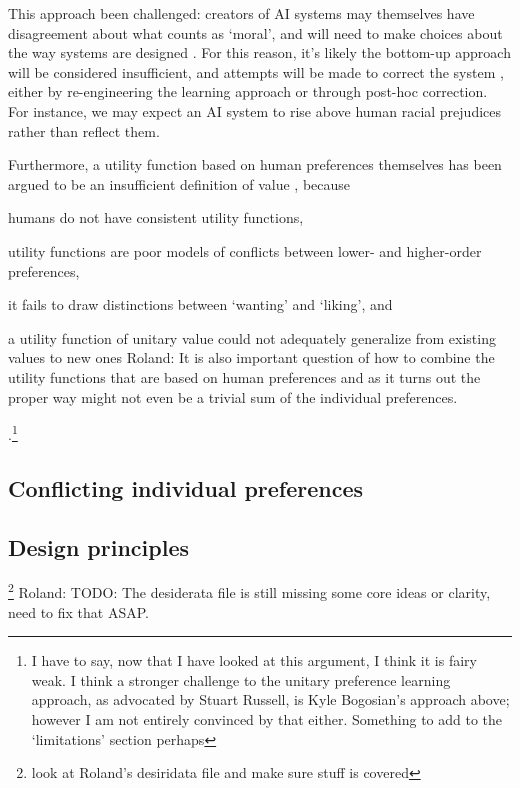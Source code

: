 This approach been challenged: creators of AI systems may themselves have disagreement about what counts as `moral', and will need to make choices about the way systems are designed  \cite{bogosian_implementation_2017}. For this reason, it's likely the bottom-up approach will be considered insufficient, and attempts will be made to correct the system \cite{stray2020you}, either by re-engineering the learning approach or through post-hoc correction. For instance, we may expect an AI system to rise above human racial prejudices rather than reflect them. 

Furthermore, a utility function based on human preferences themselves has been argued to be an insufficient definition of value \cite{sotala2016defining, DBLP:journals/corr/abs-1712-05812}, because \begin{enumerate*}
    \item humans do not have consistent utility functions,
    \item utility functions are poor models of conflicts between lower- and higher-order preferences,
    \item it fails to draw distinctions between `wanting' and `liking', and
    \item a utility function of unitary value could not adequately generalize from existing values to new ones
Roland: It is also important question of how to combine the utility functions that are based on human preferences and as it turns out the proper way might not even be a trivial sum of the individual preferences.    
\end{enumerate*}.\footnote{I have to say, now that I have looked at this argument, I think it is fairy weak. I think a stronger challenge to the unitary preference learning approach, as advocated by Stuart Russell, is Kyle Bogosian's approach above; however I am not entirely convinced by that either. Something to add to the `limitations' section perhaps}


\subsection{Conflicting individual preferences}

\subsection{Design principles}\footnote{look at Roland's desiridata file and make sure stuff is covered}
Roland: TODO: The desiderata file is still missing some core ideas or clarity, need to fix that ASAP.


